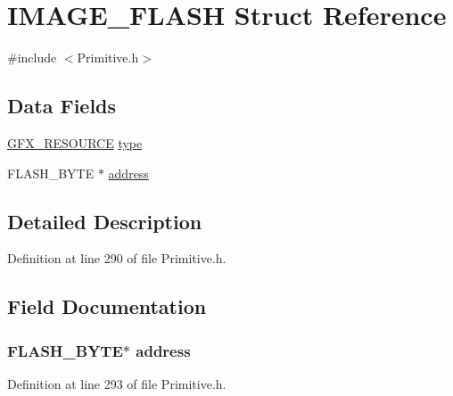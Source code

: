 \hypertarget{struct_i_m_a_g_e___f_l_a_s_h}{}\section{I\+M\+A\+G\+E\+\_\+\+F\+L\+A\+S\+H Struct Reference}
\label{struct_i_m_a_g_e___f_l_a_s_h}


{\ttfamily \#include $<$Primitive.\+h$>$}

\subsection*{Data Fields}
\begin{DoxyCompactItemize}
\item 
\hyperlink{_primitive_8h_a9a3785e6345a6e01071a873d03698baf}{G\+F\+X\+\_\+\+R\+E\+S\+O\+U\+R\+C\+E} \hyperlink{struct_i_m_a_g_e___f_l_a_s_h_ad19c8e0d19c638be9dd81d163454b0f1}{type}
\item 
F\+L\+A\+S\+H\+\_\+\+B\+Y\+T\+E $\ast$ \hyperlink{struct_i_m_a_g_e___f_l_a_s_h_a18b24c9a1b9c9ea0dc68de86dd182807}{address}
\end{DoxyCompactItemize}


\subsection{Detailed Description}


Definition at line 290 of file Primitive.\+h.



\subsection{Field Documentation}
\hypertarget{struct_i_m_a_g_e___f_l_a_s_h_a18b24c9a1b9c9ea0dc68de86dd182807}{}
\subsubsection[{address}]{\setlength{\rightskip}{0pt plus 5cm}F\+L\+A\+S\+H\+\_\+\+B\+Y\+T\+E$\ast$ address}\label{struct_i_m_a_g_e___f_l_a_s_h_a18b24c9a1b9c9ea0dc68de86dd182807}


Definition at line 293 of file Primitive.\+h.

\hypertarget{struct_i_m_a_g_e___f_l_a_s_h_ad19c8e0d19c638be9dd81d163454b0f1}{}
